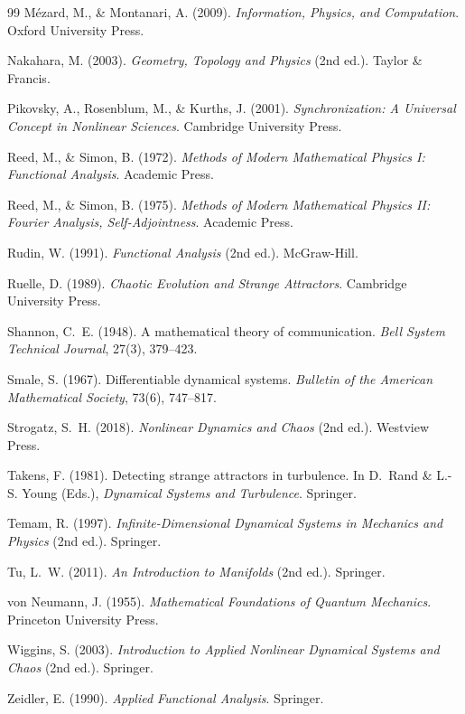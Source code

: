 \documentclass[12pt, oneside]{book}
\theoremstyle{plain}
\theoremstyle{definition}
\theoremstyle{remark}
\begin{document}
\begin{thebibliography}{99}
Mézard, M., \& Montanari, A. (2009).
\textit{Information, Physics, and Computation}.
Oxford University Press.

Nakahara, M. (2003).
\textit{Geometry, Topology and Physics} (2nd ed.).
Taylor \& Francis.

Pikovsky, A., Rosenblum, M., \& Kurths, J. (2001).
\textit{Synchronization: A Universal Concept in Nonlinear Sciences}.
Cambridge University Press.

Reed, M., \& Simon, B. (1972).
\textit{Methods of Modern Mathematical Physics I: Functional Analysis}.
Academic Press.

Reed, M., \& Simon, B. (1975).
\textit{Methods of Modern Mathematical Physics II: Fourier Analysis,
Self-Adjointness}.
Academic Press.

Rudin, W. (1991).
\textit{Functional Analysis} (2nd ed.).
McGraw-Hill.

Ruelle, D. (1989).
\textit{Chaotic Evolution and Strange Attractors}.
Cambridge University Press.

Shannon, C.~E. (1948).
A mathematical theory of communication.
\textit{Bell System Technical Journal}, 27(3), 379--423.

Smale, S. (1967).
Differentiable dynamical systems.
\textit{Bulletin of the American Mathematical Society}, 73(6), 747--817.

Strogatz, S.~H. (2018).
\textit{Nonlinear Dynamics and Chaos} (2nd ed.).
Westview Press.

Takens, F. (1981).
Detecting strange attractors in turbulence.
In D.~Rand \& L.-S. Young (Eds.),
\textit{Dynamical Systems and Turbulence}.
Springer.

Temam, R. (1997).
\textit{Infinite-Dimensional Dynamical Systems in Mechanics and Physics}
(2nd ed.).
Springer.

Tu, L.~W. (2011).
\textit{An Introduction to Manifolds} (2nd ed.).
Springer.

von Neumann, J. (1955).
\textit{Mathematical Foundations of Quantum Mechanics}.
Princeton University Press.

Wiggins, S. (2003).
\textit{Introduction to Applied Nonlinear Dynamical Systems and Chaos}
(2nd ed.).
Springer.

Zeidler, E. (1990).
\textit{Applied Functional Analysis}.
Springer.

\end{thebibliography}
\end{document}
